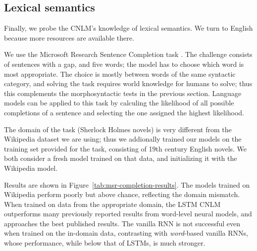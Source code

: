 

\subsection{Lexical semantics}
\label{sec:semantics}

Finally, we probe the CNLM's knowledge of lexical semantics.
We turn to  English because more resources are available there.

We use the Microsoft Research Sentence Completion task \cite{Zweig:Burges:2011}.
The challenge consists of sentences with a gap, and five words; the model has to choose which word is most appropriate.
The choice is mostly between words of the same syntactic category, and solving the task requires world knowledge for humans to solve; thus this complements the morphosyntactic tests in the previous section.
Language models can be applied to this task by calculing the likelihood of all possible completions of a sentence and selecting the one assigned the highest likelihood.

The domain of the task (Sherlock Holmes novels) is very different from the Wikipedia dataset we are using; thus we addionally trained our models on the training set provided for the task, consisting of 19th century English novels.
We both consider a fresh model trained on that data, and initializing it with the Wikipedia model.

Results are shown in Figure~\ref{tab:msr-completion-results}.
The models trained on Wikipedia perform poorly but above chance, reflecting the domain mismatch.
When trained on data from the appropriate domain, the LSTM CNLM outperforms many previously reported results from word-level neural models, and approaches the best published results.
The vanilla RNN is not successful even when trained on the in-domain data, contrasting with \emph{word}-based vanilla RNNs, whose performance, while below that of LSTMs, is much stronger.

